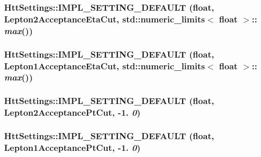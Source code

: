 \label{classHttSettings_a590977f27bcdf90a9ff244eb663a02c9}
\hypertarget{classHttSettings_a416d34e499691a6eeb0e026034b824db}{
\subsubsection[{IMPL\_\-SETTING\_\-DEFAULT}]{\setlength{\rightskip}{0pt plus 5cm}HttSettings::IMPL\_\-SETTING\_\-DEFAULT (float, \/  Lepton2AcceptanceEtaCut, \/  std::numeric\_\-limits$<$ float $>$:: {\em max}())}}
\label{classHttSettings_a416d34e499691a6eeb0e026034b824db}
\hypertarget{classHttSettings_a74b1b317822782e7dc991237867f860b}{
\subsubsection[{IMPL\_\-SETTING\_\-DEFAULT}]{\setlength{\rightskip}{0pt plus 5cm}HttSettings::IMPL\_\-SETTING\_\-DEFAULT (float, \/  Lepton1AcceptanceEtaCut, \/  std::numeric\_\-limits$<$ float $>$:: {\em max}())}}
\label{classHttSettings_a74b1b317822782e7dc991237867f860b}
\hypertarget{classHttSettings_a112b65cd9e21261b74816f2fadea34eb}{
\subsubsection[{IMPL\_\-SETTING\_\-DEFAULT}]{\setlength{\rightskip}{0pt plus 5cm}HttSettings::IMPL\_\-SETTING\_\-DEFAULT (float, \/  Lepton2AcceptancePtCut, \/  -\/1. {\em 0})}}
\label{classHttSettings_a112b65cd9e21261b74816f2fadea34eb}
\hypertarget{classHttSettings_ab8d151b450153fb32b2a421d7ee0ca41}{
\subsubsection[{IMPL\_\-SETTING\_\-DEFAULT}]{\setlength{\rightskip}{0pt plus 5cm}HttSettings::IMPL\_\-SETTING\_\-DEFAULT (float, \/  Lepton1AcceptancePtCut, \/  -\/1. {\em 0})}}
